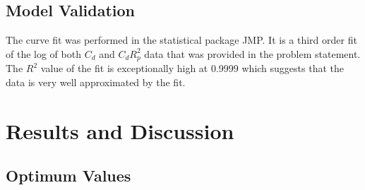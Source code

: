 \documentclass{article}
\begin{document}
\subsection{Model Validation}
The curve fit was performed in the statistical package JMP. It is a third order fit of the log of both $C_d$ and $C_dR_p^2$ data that was provided in the problem statement.  The $R^2$ value of the fit is exceptionally high at 0.9999 which suggests that the data is very well approximated by the fit.


\section{Results and Discussion}
\subsection{Optimum Values}
\end{document}
